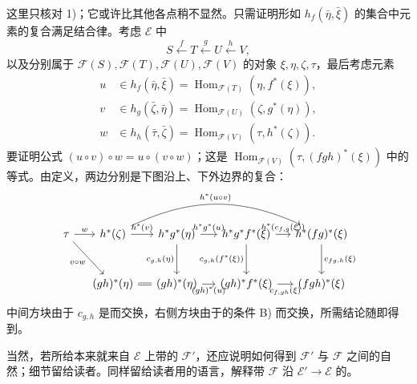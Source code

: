 这里只核对 1)；它或许比其他各点稍不显然。只需证明形如 $h_f(\bar\eta,\bar\xi)$ 的集合中元素的复合满足结合律。考虑 $\mathcal E$ 中
\[
 S\xleftarrow{f}T\xleftarrow{g}U\xleftarrow{h}V,
\]
以及分别属于 $\mathcal F(S),\mathcal F(T),\mathcal F(U),\mathcal F(V)$ 的对象 $\xi,\eta,\zeta,\tau$，最后考虑元素
\[
 \begin{aligned}
 u&\in h_f(\bar\eta,\bar\xi)=\operatorname{Hom}_{\mathcal F(T)}(\eta,f^*(\xi)),\\
 v&\in h_g(\bar\zeta,\bar\eta)=\operatorname{Hom}_{\mathcal F(U)}(\zeta,g^*(\eta)),\\
 w&\in h_h(\bar\tau,\bar\zeta)=\operatorname{Hom}_{\mathcal F(V)}(\tau,h^*(\zeta)).
 \end{aligned}
\]
要证明公式 $(u\circ v)\circ w=u\circ(v\circ w)$；这是 $\operatorname{Hom}_{\mathcal F(V)}(\tau,(fgh)^*(\xi))$ 中的等式。由定义，两边分别是下图沿上、下外边界的复合：
\[
\begin{tikzcd}[column sep=small,row sep=large]
 \tau\arrow[r,"w"]\arrow[dr,"v\circ w"']&
 h^*(\zeta)\arrow[r,"h^*(v)"]\arrow[rrr,bend left=25,"h^*(u\circ v)"]&
 h^*g^*(\eta)\arrow[r,"h^*g^*(u)"]\arrow[d,"{c_{g,h}(\eta)}"']&
 h^*g^*f^*(\xi)\arrow[r,"{h^*(c_{f,g}(\xi))}"]\arrow[d,"{c_{g,h}(f^*(\xi))}"']&
 h^*(fg)^*(\xi)\arrow[d,"{c_{fg,h}(\xi)}"]\\
 & (gh)^*(\eta)\arrow[r,equal]& (gh)^*(\eta)\arrow[r,"(gh)^*(u)"']&
 (gh)^*f^*(\xi)\arrow[r,"{c_{f,gh}(\xi)}"']&(fgh)^*(\xi)
\end{tikzcd}
\]
中间方块由于 $c_{g,h}$ 是而交换，右侧方块由于的条件 B) 而交换，所需结论随即得到。

当然，若所给本来就来自 $\mathcal E$ 上带的 $\mathcal F'$，还应说明如何得到 $\mathcal F'$ 与 $\mathcal F$ 之间的自然；细节留给读者。同样留给读者用的语言，解释带 $\mathcal F$ 沿 $\mathcal E'\to\mathcal E$ 的。

